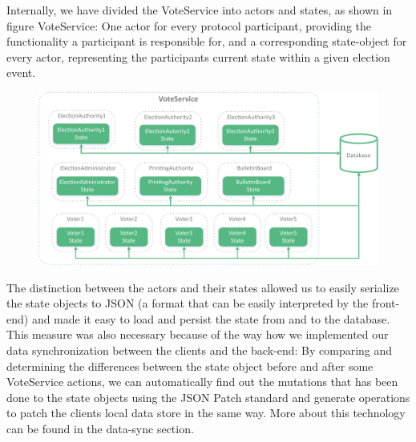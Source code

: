 Internally, we have divided the VoteService into actors and states, as shown in figure {VoteService}: One actor for every protocol participant, providing the functionality a participant is responsible for, and a corresponding state-object for every actor, representing the participants current state within a given election event.

\begin{figure}[p]
\begin{center}
\includegraphics[scale=0.68]{assets/voteservice.pdf}
\label{VoteService}%
\end{center}
\end{figure}

The distinction between the actors and their states allowed us to easily serialize the state objects to JSON (a format that can be easily interpreted by the front-end) and made it easy to load and persist the state from and to the database. This measure was also necessary because of the way how we implemented our data synchronization between the clients and the back-end: By comparing and determining the differences between the state object before and after some VoteService actions, we can automatically find out the mutations that has been done to the state objects using the JSON Patch standard and generate operations to patch the clients local data store in the same way. More about this technology can be found in the data-sync section.


